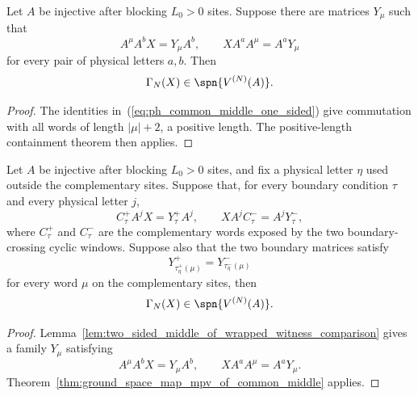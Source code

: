 \begin{theorem}
    \label{thm:ground_space_map_mpv_of_common_middle}
    \leanok
    Let $A$ be injective after blocking $L_0>0$ sites. Suppose there are matrices
    $Y_\mu$ such that
    \[
        A^\mu A^b X = Y_\mu A^b,
        \qquad
        X A^a A^\mu = A^a Y_\mu
    \]
    for every pair of physical letters $a,b$. Then
    \[
        \Gamma_N(X)\in\spn\{V^{(N)}(A)\}.
    \]
\end{theorem}

\begin{proof}
    \leanok
    The identities in~(\ref{eq:ph_common_middle_one_sided}) give commutation
    with all words of length $|\mu|+2$, a positive length. The positive-length
    containment theorem then applies.
\end{proof}

\begin{theorem}
    \label{thm:ground_space_map_mpv_of_wrapped_witness_comparison}
    \leanok
    Let $A$ be injective after blocking $L_0>0$ sites, and fix a physical letter
    $\eta$ used outside the complementary sites. Suppose that, for every
    boundary condition $\tau$ and every physical letter $j$,
    \[
        C^+_\tau A^jX=Y^+_\tau A^j,
        \qquad
        XA^jC^-_\tau=A^jY^-_\tau,
    \]
    where $C^+_\tau$ and $C^-_\tau$ are the complementary words exposed by the
    two boundary-crossing cyclic windows. Suppose also that the two boundary
    matrices satisfy
    \[
        Y^+_{\tau^+_\eta(\mu)} = Y^-_{\tau^-_\eta(\mu)}
    \]
    for every word $\mu$ on the complementary sites, then
    \[
        \Gamma_N(X)\in\spn\{V^{(N)}(A)\}.
    \]
\end{theorem}

\begin{proof}
    \leanok
    Lemma~\ref{lem:two_sided_middle_of_wrapped_witness_comparison} gives a
    family \(Y_\mu\) satisfying
    \[
        A^\mu A^bX=Y_\mu A^b,
        \qquad
        XA^aA^\mu=A^aY_\mu.
    \]
    Theorem~\ref{thm:ground_space_map_mpv_of_common_middle} applies.
\end{proof}


